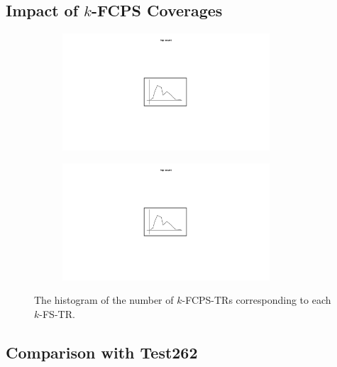 \subsection{Impact of $k$-FCPS Coverages}\label{sec:impact-k-fcps}

\begin{figure}
  \centering
  \begin{subfigure}{0.45\textwidth}
    \centering
    \includegraphics[width=0.85\textwidth]{img/fcp-count-1}
  \end{subfigure}
  \begin{subfigure}{0.45\textwidth}
    \centering
    \includegraphics[width=0.85\textwidth]{img/fcp-count-1}
  \end{subfigure}
  \caption{
    The histogram of the number of $k$-FCPS-TRs corresponding to each $k$-FS-TR.
  }
  \label{fig:spec-cfg-id}
\end{figure}

\todo


\subsection{Comparison with Test262}\label{sec:compare-test262}

